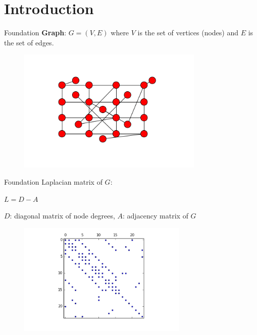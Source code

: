 \documentclass[xcolor=dvipsnames,10pt]{beamer}
\begin{document}
\section{Introduction}

\begin{frame}{Foundation}
\vspace{.3in}
\textbf{Graph}: $G=(V,E)$ where $V$ is the set of vertices (nodes) and $E$ is the set of edges.

\begin{figure}
\begin{center}
\includegraphics[width = 3.5in]{entiregraph.png}
\end{center}
\end{figure}
\end{frame}





\begin{frame}{Foundation}
\vspace{.3in}
Laplacian matrix of $G$:\\
\begin{center}
$L=D-A$\\
\end{center}
$D$: diagonal matrix of node degrees, $A$: adjacency matrix of $G$

\begin{figure}
\begin{center}
\includegraphics[width = 3.2in]{gridspy.png}
\end{center}
\end{figure}
\end{frame}
\end{document}
